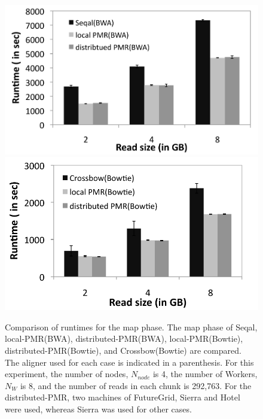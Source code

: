 \documentclass{acm_proc_article-sp}
\begin{document}
\begin{figure} 
 \centering
\includegraphics[scale=0.54]{figures/seqal_lpmr_dpmr.pdf}
\includegraphics[scale=0.59]{figures/cb_lpmr_dpmr.pdf}
\caption{\small  Comparison of runtimes for the map phase. The map phase of Seqal, local-PMR(BWA), distributed-PMR(BWA), local-PMR(Bowtie), distributed-PMR(Bowtie), and Crossbow(Bowtie) are compared.  The aligner used for each case is indicated in a parenthesis.  For this experiment, the number of nodes, $N_{node}$ is 4, the number of Workers, $N_W$ is 8, and the number of reads in each chunk is 292,763.  For the distributed-PMR, two machines of FutureGrid, Sierra and Hotel were used, whereas Sierra was used for other cases.}
  \label{fig:tool_comp} 


\end{figure}
\end{document}
